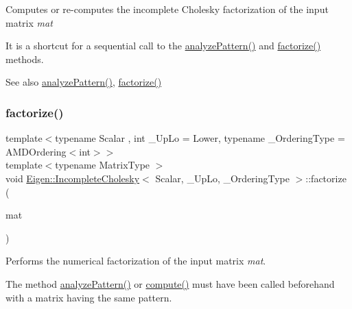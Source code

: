 Computes or re-\/computes the incomplete Cholesky factorization of the input matrix {\itshape mat} 

It is a shortcut for a sequential call to the \mbox{\hyperlink{class_eigen_1_1_incomplete_cholesky_a702560ecdddef77dc51d20ab22bd974e}{analyze\+Pattern()}} and \mbox{\hyperlink{class_eigen_1_1_incomplete_cholesky_ac39c75ff7ca5d2db9a9f03b937e12601}{factorize()}} methods.

\begin{DoxySeeAlso}{See also}
\mbox{\hyperlink{class_eigen_1_1_incomplete_cholesky_a702560ecdddef77dc51d20ab22bd974e}{analyze\+Pattern()}}, \mbox{\hyperlink{class_eigen_1_1_incomplete_cholesky_ac39c75ff7ca5d2db9a9f03b937e12601}{factorize()}} 
\end{DoxySeeAlso}
\mbox{\label{class_eigen_1_1_incomplete_cholesky_ac39c75ff7ca5d2db9a9f03b937e12601}} 
\subsubsection{\texorpdfstring{factorize()}{factorize()}}
{\footnotesize\ttfamily template$<$typename Scalar , int \+\_\+\+Up\+Lo = Lower, typename \+\_\+\+Ordering\+Type  = A\+M\+D\+Ordering$<$int$>$$>$ \\
template$<$typename Matrix\+Type $>$ \\
void \mbox{\hyperlink{class_eigen_1_1_incomplete_cholesky}{Eigen\+::\+Incomplete\+Cholesky}}$<$ Scalar, \+\_\+\+Up\+Lo, \+\_\+\+Ordering\+Type $>$\+::factorize (\begin{DoxyParamCaption}\item[{const Matrix\+Type \&}]{mat }\end{DoxyParamCaption})}



Performs the numerical factorization of the input matrix {\itshape mat}. 

The method \mbox{\hyperlink{class_eigen_1_1_incomplete_cholesky_a702560ecdddef77dc51d20ab22bd974e}{analyze\+Pattern()}} or \mbox{\hyperlink{class_eigen_1_1_incomplete_cholesky_a7966bedeebbeaa7a8fe4dd1da3797a0b}{compute()}} must have been called beforehand with a matrix having the same pattern.

